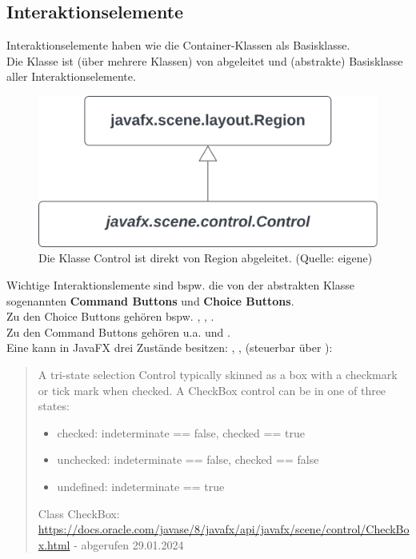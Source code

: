 \subsection{Interaktionselemente}

Interaktionselemente haben wie die Container-Klassen  als Basisklasse.\\

\noindent
Die Klasse  ist (über mehrere Klassen) von  abgeleitet und (abstrakte) Basisklasse aller Interaktionselemente.

\begin{figure}
    \centering
    \includegraphics[scale=0.5]{chapters/fopt3/img/javafx/control}
    \caption{Die Klasse Control ist direkt von Region abgeleitet. (Quelle: eigene)}
    \label{fig:control}
\end{figure}



\noindent
Wichtige Interaktionslemente sind bspw. die von der abstrakten Klasse  sogenannten \textbf{Command Buttons} und \textbf{Choice Buttons}.\\
Zu den Choice Buttons gehören bspw. , , .\\
Zu den Command Buttons gehören u.a.  und .\\

\noindent
Eine  kann in JavaFX drei Zustände besitzen: , ,  (steuerbar über ):

\blockquote[{Class CheckBox: \url{https://docs.oracle.com/javase/8/javafx/api/javafx/scene/control/CheckBox.html} - abgerufen 29.01.2024}]{
    A tri-state selection Control typically skinned as a box with a checkmark or tick mark when checked. A CheckBox control can be in one of three states:
    \begin{itemize}
        \item checked: indeterminate == false, checked == true
        \item unchecked: indeterminate == false, checked == false
        \item undefined: indeterminate == true
    \end{itemize}
}


